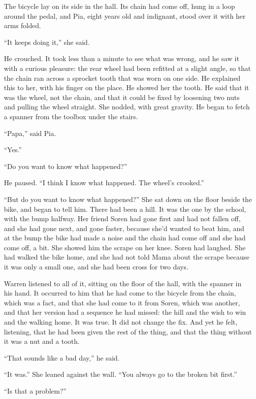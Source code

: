 The bicycle lay on its side in the hall. Its chain had come off, hung in a loop around the pedal, and Pia, eight years old and indignant, stood over it with her arms folded.

``It keeps doing it,'' she said.

He crouched. It took less than a minute to see what was wrong, and he saw it with a curious pleasure: the rear wheel had been refitted at a slight angle, so that the chain ran across a sprocket tooth that was worn on one side. He explained this to her, with his finger on the place. He showed her the tooth. He said that it was the wheel, not the chain, and that it could be fixed by loosening two nuts and pulling the wheel straight. She nodded, with great gravity. He began to fetch a spanner from the toolbox under the stairs.

``Papa,'' said Pia.

``Yes.''

``Do you want to know what happened?''

He paused. ``I think I know what happened. The wheel's crooked.''

``But do you want to know what happened?'' She sat down on the floor beside the bike, and began to tell him. There had been a hill. It was the one by the school, with the bump halfway. Her friend Soren had gone first and had not fallen off, and she had gone next, and gone faster, because she'd wanted to beat him, and at the bump the bike had made a noise and the chain had come off and she had come off, a bit. She showed him the scrape on her knee. Soren had laughed. She had walked the bike home, and she had not told Mama about the scrape because it was only a small one, and she had been cross for two days.

Warren listened to all of it, sitting on the floor of the hall, with the spanner in his hand. It occurred to him that he had come to the bicycle from the chain, which was a fact, and that she had come to it from Soren, which was another, and that her version had a sequence he had missed: the hill and the wish to win and the walking home. It was true. It did not change the fix. And yet he felt, listening, that he had been given the rest of the thing, and that the thing without it was a nut and a tooth.

``That sounds like a bad day,'' he said.

``It was.'' She leaned against the wall. ``You always go to the broken bit first.''

``Is that a problem?''

